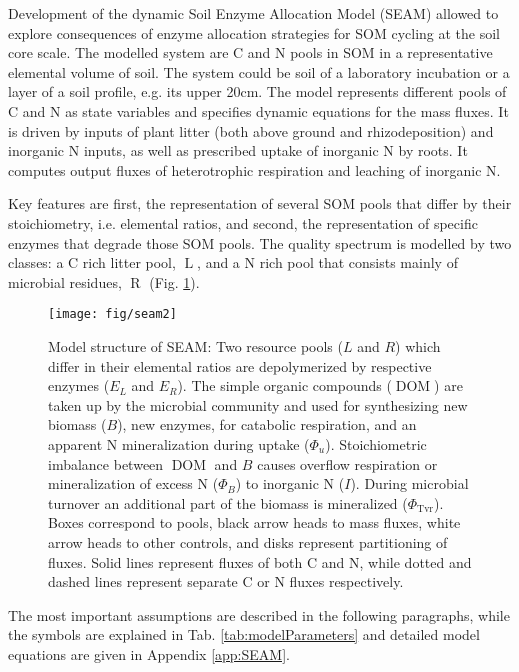 Development of the dynamic Soil Enzyme Allocation Model
(SEAM) allowed to explore consequences of enzyme allocation strategies for SOM
cycling at the soil core scale. The modelled system are C and N
pools in SOM in a representative elemental volume of soil. The
system could be soil of a laboratory incubation or a layer of a soil profile,
e.g. its upper 20cm.
The model represents different pools of C and N as state variables
and specifies dynamic equations for the mass fluxes. It is driven by inputs of
plant litter (both above ground and rhizodeposition) and inorganic N
inputs, as well as prescribed uptake of inorganic N by roots.  It
computes output fluxes of heterotrophic respiration and leaching of inorganic
N.

Key features are first, the representation of several SOM pools that differ by
their stoichiometry, i.e. elemental ratios, and second, the representation of
specific enzymes that degrade those SOM pools. The quality spectrum is modelled by two
classes: a C rich litter pool,
$\operatorname{L}$, and a N rich pool that consists
mainly of microbial residues, $\operatorname{R}$ (Fig. \ref{fig:SEAMStruct}).

\begin{figure}[t] \vspace*{2mm}
\begin{center}
\texttt{[image: fig/seam2]}
\end{center}
\caption{
Model structure of SEAM: Two resource pools ($L$ and $R$) which differ in their
elemental ratios are depolymerized by respective enzymes ($E_L$ and $E_R$). The
simple organic compounds ($\operatorname{DOM}$) are taken up by the microbial
community  and used for synthesizing new biomass (${B}$), new enzymes, for
catabolic respiration, and an apparent N mineralization during uptake
($\Phi_u$). Stoichiometric imbalance between $\operatorname{DOM}$ and ${B}$
causes overflow respiration or mineralization of excess N ($\Phi_B$) to
inorganic N ($I$).
During microbial turnover an additional part of the biomass is mineralized
($\Phi_{\operatorname{Tvr}}$).
Boxes correspond to pools, black arrow heads to mass fluxes, white arrow heads
to other controls, and disks represent partitioning of fluxes. Solid lines
represent fluxes of both C and N, while dotted and dashed lines represent
separate C or N fluxes respectively.
\label{fig:SEAMStruct}
}
\end{figure}

The most important assumptions are described in the following paragraphs, while
the symbols are explained in Tab. \ref{tab:modelParameters} and detailed model
equations are given in Appendix \ref{app:SEAM}. 

